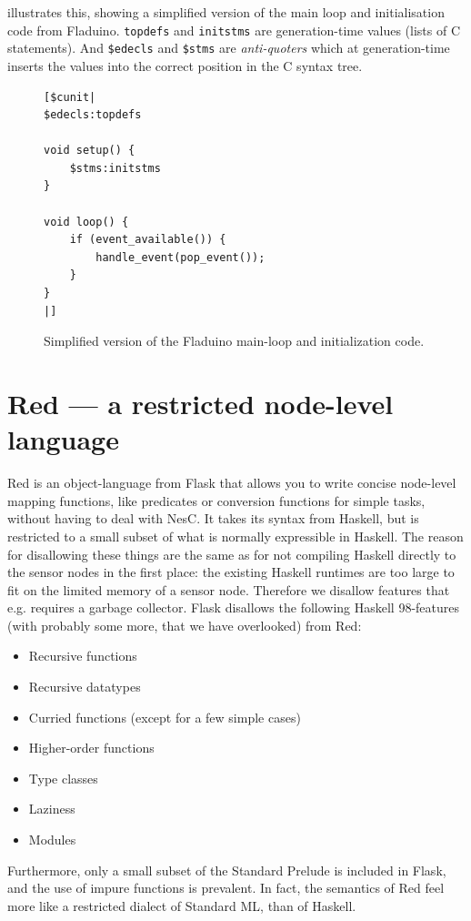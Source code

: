 \documentclass[a4paper, oneside, final]{memoir}
\let\Fref\undefined
\begin{document}
\Fref{fig:mainloop} illustrates this, showing a simplified
version of the main loop and initialisation code from Fladuino.
\texttt{topdefs} and \texttt{initstms} are generation-time values
(lists of C statements). And \texttt{\$edecls} and \texttt{\$stms} are
\textit{anti-quoters} which at generation-time inserts the values into
the correct position in the C syntax tree.

\begin{figure}
\begin{verbatim}
[$cunit|
$edecls:topdefs

void setup() {
    $stms:initstms
}

void loop() {
    if (event_available()) {
        handle_event(pop_event());
    }
}
|]
\end{verbatim}
\caption{Simplified version of the Fladuino main-loop and
  initialization code.}
\label{fig:mainloop}
\end{figure}

\section{Red --- a restricted node-level language}
\label{sec:red}
Red is an object-language from Flask that allows you to write concise
node-level mapping functions, like predicates or conversion functions
for simple tasks, without having to deal with NesC. It takes its
syntax from Haskell, but is restricted to a small subset of what is
normally expressible in Haskell. The reason for disallowing these
things are the same as for not compiling Haskell directly to the
sensor nodes in the first place: the existing Haskell runtimes are too
large to fit on the limited memory of a sensor node. Therefore we
disallow features that e.g.  requires a garbage collector. Flask
disallows the following Haskell 98-features (with probably some more,
that we have overlooked) from Red:
\begin{itemize}
\item Recursive functions
\item Recursive datatypes
\item Curried functions (except for a few simple cases)
\item Higher-order functions
\item Type classes
\item Laziness
\item Modules
\end{itemize}

Furthermore, only a small subset of the Standard Prelude is included
in Flask, and the use of impure functions is prevalent.  In fact, the
semantics of Red feel more like a restricted dialect of Standard ML,
than of Haskell.
\end{document}
